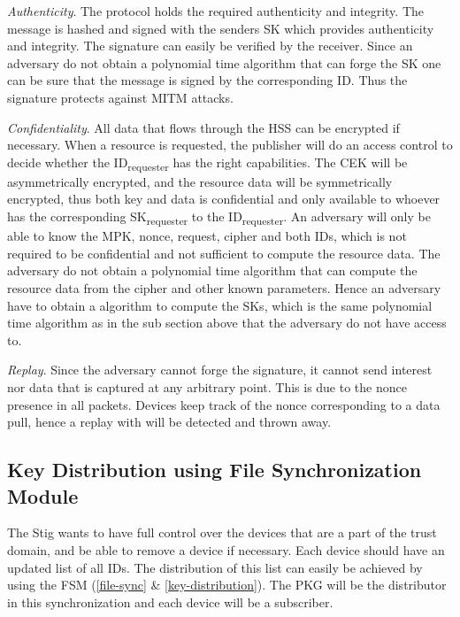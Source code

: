 \textit{Authenticity}.
The protocol holds the required authenticity and integrity. 
The message is hashed and signed with the senders \gls{SK} which provides authenticity and integrity.
The signature can easily be verified by the receiver.
Since an adversary do not obtain a polynomial time algorithm that can forge the \gls{SK} one can be sure that the message is signed by the corresponding ID.
Thus the signature protects against \gls{MITM} attacks.

\textit{Confidentiality}. 
All \gls{data} that flows through the \gls{HSS} can be encrypted if necessary. 
When a resource is requested, the \gls{publisher} will do an access control to decide whether the ID\textsubscript{requester} has the right capabilities. 
The \gls{CEK} will be asymmetrically encrypted, and the resource data will be symmetrically encrypted, thus both key and data is confidential and only available to whoever has the corresponding \gls{SK}\textsubscript{requester} to the ID\textsubscript{requester}.
An adversary will only be able to know the \gls{MPK}, nonce, request, cipher and both IDs, which is not required to be confidential and not sufficient to compute the resource data. 
The adversary do not obtain a polynomial time algorithm that can compute the resource data from the cipher and other known parameters.
Hence an adversary have to obtain a algorithm to compute the \gls{SK}s, which is the same polynomial time algorithm as in the sub section above that the adversary do not have access to.

\textit{Replay}.
Since the adversary cannot forge the signature, it cannot send \gls{interest} nor \gls{data} that is captured at any arbitrary point. 
This is due to the nonce presence in all packets. 
Devices keep track of the nonce corresponding to a data pull, hence a replay with will be detected and thrown away.

\subsection{Key Distribution using File Synchronization Module}

The Stig wants to have full control over the devices that are a part of the trust domain, and be able to remove a device if necessary.
Each device should have an updated list of all \gls{ID}s.
The distribution of this list can easily be achieved by using the \gls{FSM} (\autoref{file-sync} \& \autoref{key-distribution}).
The \gls{PKG} will be the distributor in this synchronization and each device will be a subscriber.


